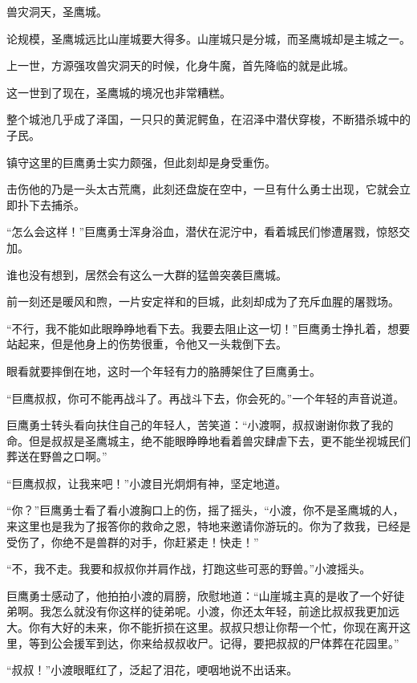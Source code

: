 
\begin{this_body}

兽灾洞天，圣鹰城。

论规模，圣鹰城远比山崖城要大得多。山崖城只是分城，而圣鹰城却是主城之一。

上一世，方源强攻兽灾洞天的时候，化身牛魔，首先降临的就是此城。

这一世到了现在，圣鹰城的境况也非常糟糕。

整个城池几乎成了泽国，一只只的黄泥鳄鱼，在沼泽中潜伏穿梭，不断猎杀城中的子民。

镇守这里的巨鹰勇士实力颇强，但此刻却是身受重伤。

击伤他的乃是一头太古荒鹰，此刻还盘旋在空中，一旦有什么勇士出现，它就会立即扑下去捕杀。

“怎么会这样！”巨鹰勇士浑身浴血，潜伏在泥泞中，看着城民们惨遭屠戮，惊怒交加。

谁也没有想到，居然会有这么一大群的猛兽突袭巨鹰城。

前一刻还是暖风和煦，一片安定祥和的巨城，此刻却成为了充斥血腥的屠戮场。

“不行，我不能如此眼睁睁地看下去。我要去阻止这一切！”巨鹰勇士挣扎着，想要站起来，但是他身上的伤势很重，令他又一头栽倒下去。

眼看就要摔倒在地，这时一个年轻有力的胳膊架住了巨鹰勇士。

“巨鹰叔叔，你可不能再战斗了。再战斗下去，你会死的。”一个年轻的声音说道。

巨鹰勇士转头看向扶住自己的年轻人，苦笑道：“小渡啊，叔叔谢谢你救了我的命。但是叔叔是圣鹰城主，绝不能眼睁睁地看着兽灾肆虐下去，更不能坐视城民们葬送在野兽之口啊。”

“巨鹰叔叔，让我来吧！”小渡目光炯炯有神，坚定地道。

“你？”巨鹰勇士看了看小渡胸口上的伤，摇了摇头，“小渡，你不是圣鹰城的人，来这里也是我为了报答你的救命之恩，特地来邀请你游玩的。你为了救我，已经是受伤了，你绝不是兽群的对手，你赶紧走！快走！”

“不，我不走。我要和叔叔你并肩作战，打跑这些可恶的野兽。”小渡摇头。

巨鹰勇士感动了，他拍拍小渡的肩膀，欣慰地道：“山崖城主真的是收了一个好徒弟啊。我怎么就没有你这样的徒弟呢。小渡，你还太年轻，前途比叔叔我更加远大。你有大好的未来，你不能折损在这里。叔叔只想让你帮一个忙，你现在离开这里，等到公会援军到达，你来给叔叔收尸。记得，要把叔叔的尸体葬在花园里。”

“叔叔！”小渡眼眶红了，泛起了泪花，哽咽地说不出话来。


\end{this_body}
